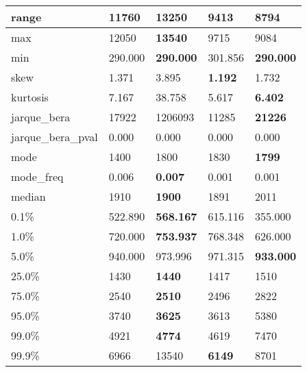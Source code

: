 \begin{table}[H]
\begin{tabular}{|l|m{10em}|m{10em}|m{10em}|m{10em}|}
\hline range & 11760 & \bfseries 13250 & 9413 & \cellcolor[rgb]{0.9, 0.54, 0.52} 8794 \\
\hline max & 12050 & \bfseries 13540 & 9715 & \cellcolor[rgb]{0.9, 0.54, 0.52} 9084 \\
\hline min & 290.000 & \bfseries 290.000 & \cellcolor[rgb]{0.9, 0.54, 0.52} 301.856 & \bfseries 290.000 \\
\hline skew & 1.371 & \cellcolor[rgb]{0.9, 0.54, 0.52} 3.895 & \bfseries 1.192 & 1.732 \\
\hline kurtosis & 7.167 & \cellcolor[rgb]{0.9, 0.54, 0.52} 38.758 & 5.617 & \bfseries 6.402 \\
\hline jarque\_bera & 17922 & \cellcolor[rgb]{0.9, 0.54, 0.52} 1206093 & 11285 & \bfseries 21226 \\
\hline jarque\_bera\_pval & 0.000 & 0.000 & 0.000 & 0.000 \\
\hline mode & 1400 & 1800 & \cellcolor[rgb]{0.9, 0.54, 0.52} 1830 & \bfseries 1799 \\
\hline mode\_freq & 0.006 & \bfseries 0.007 & \cellcolor[rgb]{0.9, 0.54, 0.52} 0.001 & 0.001 \\
\hline median & 1910 & \bfseries 1900 & 1891 & \cellcolor[rgb]{0.9, 0.54, 0.52} 2011 \\
\hline 0.1\% & 522.890 & \bfseries 568.167 & 615.116 & \cellcolor[rgb]{0.9, 0.54, 0.52} 355.000 \\
\hline 1.0\% & 720.000 & \bfseries 753.937 & 768.348 & \cellcolor[rgb]{0.9, 0.54, 0.52} 626.000 \\
\hline 5.0\% & 940.000 & \cellcolor[rgb]{0.9, 0.54, 0.52} 973.996 & 971.315 & \bfseries 933.000 \\
\hline 25.0\% & 1430 & \bfseries 1440 & 1417 & \cellcolor[rgb]{0.9, 0.54, 0.52} 1510 \\
\hline 75.0\% & 2540 & \bfseries 2510 & 2496 & \cellcolor[rgb]{0.9, 0.54, 0.52} 2822 \\
\hline 95.0\% & 3740 & \bfseries 3625 & 3613 & \cellcolor[rgb]{0.9, 0.54, 0.52} 5380 \\
\hline 99.0\% & 4921 & \bfseries 4774 & 4619 & \cellcolor[rgb]{0.9, 0.54, 0.52} 7470 \\
\hline 99.9\% & 6966 & \cellcolor[rgb]{0.9, 0.54, 0.52} 13540 & \bfseries 6149 & 8701 \\
\hline
\end{tabular}
\end{table}
